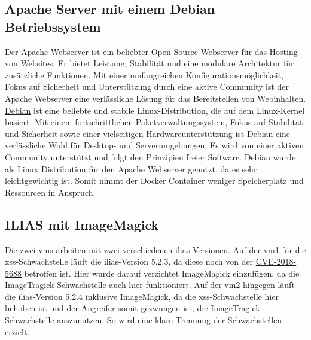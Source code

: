 \documentclass[10pt, a4paper,onecolumn ,titlepage]{article}
\begin{document}
    \subsection{Apache Server mit einem Debian Betriebssystem}
    \label{subsec:apacheServer}
    Der \href{https://httpd.apache.org/}{Apache Webserver} ist ein beliebter Open-Source-Webserver für das Hosting von Websites.
    Er bietet Leistung, Stabilität und eine modulare Architektur für zusätzliche Funktionen.
    Mit einer umfangreichen Konfigurationsmöglichkeit, Fokus auf Sicherheit und Unterstützung durch eine aktive Community ist der Apache Webserver eine verlässliche Lösung für das Bereitstellen von Webinhalten.
    \href{https://www.debian.org/}{Debian} ist eine beliebte und stabile Linux-Distribution, die auf dem Linux-Kernel basiert.
    Mit einem fortschrittlichen Paketverwaltungssystem, Fokus auf Stabilität und Sicherheit sowie einer vielseitigen Hardwareunterstützung ist Debian eine verlässliche Wahl für Desktop- und Serverumgebungen.
    Es wird von einer aktiven Community unterstützt und folgt den Prinzipien freier Software.
    Debian wurde als Linux Distribution für den Apache Webserver genutzt, da es sehr leichtgewichtig ist.
    Somit nimmt der Docker Container weniger Speicherplatz und Ressourcen in Anspruch.

    \subsection{ILIAS mit ImageMagick}
    \label{subsec:iliasTechnologie}
    Die zwei \ac{vm}s arbeiten mit zwei verschiedenen \ac{ilias}-Versionen.
    Auf der \ac{vm}1 für die \ac{xss}-Schwachstelle läuft die \ac{ilias}-Version 5.2.3, da diese noch von der \hyperref[subsubsec:CVE-2018-5688]{CVE-2018-5688} betroffen ist.
    Hier wurde darauf verzichtet ImageMagick einzufügen, da die \hyperref[subsubsec:CVE-2016-3714]{ImageTragick}-Schwachstelle auch hier funktioniert.
    Auf der \ac{vm}2 hingegen läuft die \ac{ilias}-Version 5.2.4 inklusive ImageMagick, da die \ac{xss}-Schwachstelle hier behoben ist und der Angreifer somit gezwungen ist, die ImageTragick-Schwachstelle auszunutzen.
    So wird eine klare Trennung der Schwachstellen erzielt.
\end{document}
